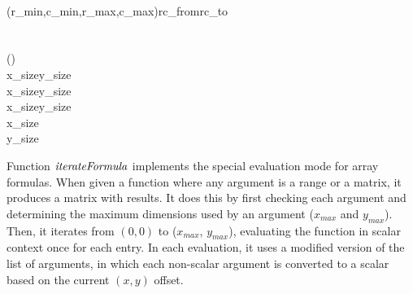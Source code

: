 \begin{hscode}
\>[10]{}\<[13]%
\>[13]{}\<[E]%
\\
\>[13]{}\<[16]%
\>[16]{}(r_{min},c_{min},r_{max},c_{max})\mathrel{=}\;\;rc_{from}\;rc_{to}{}\<[E]%
\\
\>[4]{}\<[7]%
\>[7]{}\to {}\<[E]%
\\
\>[B]{}\<[4]%
\>[4]{}\<[E]%
\\
\>[4]{}\<[7]%
\>[7]{}\mathbin{::}\to {}\to {}\to {}\to (\to {}\to {})\to {}\<[E]%
\\
\>[4]{}\<[7]%
\>[7]{}\;\;\;x_{size}\;y_{size}\;\<[E]%
\\
\>[7]{}\<[10]%
\>[10]{}\mid x_{size}\mathbin{>}\<[24]%
\>[24]{}\mathrel{\wedge}{}\<[24E]%
\>[28]{}y_{size}\mathbin{>}\<[40]%
\>[40]{}\mathrel{=}\;\;\<[E]%
\\
\>[7]{}\<[10]%
\>[10]{}\mid x_{size}\equiv {}\<[24]%
\>[24]{}\mathrel{\wedge}{}\<[24E]%
\>[28]{}y_{size}\equiv {}\<[40]%
\>[40]{}\mathrel{=}\;\;\<[E]%
\\
\>[7]{}\<[10]%
\>[10]{}\mid x_{size}\equiv {}\<[24]%
\>[24]{}\mathrel{\wedge}{}\<[24E]%
\>[28]{}\mathbin{>}\<[40]%
\>[40]{}\mathrel{=}\;\;\<[E]%
\\
\>[7]{}\<[10]%
\>[10]{}\mid y_{size}\equiv {}\<[24]%
\>[24]{}\mathrel{\wedge}{}\<[24E]%
\>[28]{}\mathbin{>}\<[40]%
\>[40]{}\mathrel{=}\;\;\<[E]%
\\
\>[7]{}\<[10]%
\>[10]{}\mid {}\<[40]%
\>[40]{}\mathrel{=}\mathbin{\$}\;\<[E]%
\ColumnHook
\end{hscode}\resethooks

Function \ensuremath{\Varid{iterateFormula}} implements the special evaluation mode for array
formulas. When given a function where any argument is a range or a matrix, it
produces a matrix with results. It does this by first checking each argument
and determining the maximum dimensions used by an argument (\ensuremath{x_{max}} and
\ensuremath{y_{max}}). Then, it iterates from $(0, 0)$ to (\ensuremath{x_{max}}, \ensuremath{y_{max}}), evaluating the
function in scalar context once for each entry. In each evaluation, it uses a
modified version of the list of arguments, in which each non-scalar argument
is converted to a scalar based on the current $(x, y)$ offset.

